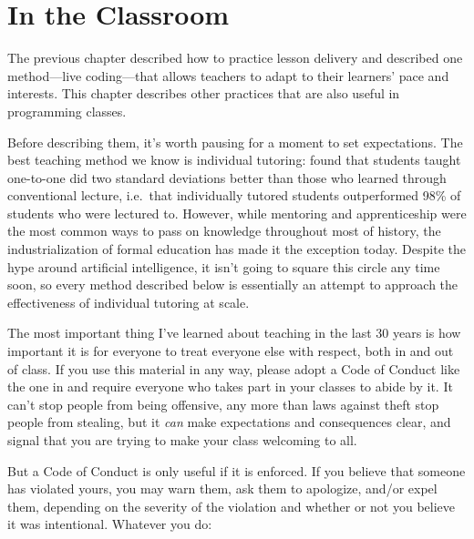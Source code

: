 \chapter{In the Classroom}\label{s:classroom}

The previous chapter described how to practice lesson delivery
and described one method---live coding---that
allows teachers to adapt to their learners' pace and interests.
This chapter describes other practices that are also useful in programming classes.

Before describing them,
it's worth pausing for a moment to set expectations.
The best teaching method we know is individual tutoring:
\cite{Bloo1984} found that students taught one-to-one
did two standard deviations better than those who learned through conventional lecture,
i.e.\ that individually tutored students outperformed
98\% of students who were lectured to.
However,
while mentoring and apprenticeship were the most common ways to pass on knowledge
throughout most of history,
the industrialization of formal education has made it the exception today.
Despite the hype around artificial intelligence,
it isn't going to square this circle any time soon,
so every method described below is essentially
an attempt to approach the effectiveness of individual tutoring at scale.


The most important thing I've learned about teaching in the last 30 years is
how important it is for everyone to treat everyone else with respect,
both in and out of class.
If you use this material in any way,
please adopt a Code of Conduct like the one in 
and require everyone who takes part in your classes to abide by it.
It can't stop people from being offensive,
any more than laws against theft stop people from stealing,
but it \emph{can} make expectations and consequences clear,
and signal that you are trying to make your class welcoming to all.

But a Code of Conduct is only useful if it is enforced.
If you believe that someone has violated yours,
you may warn them,
ask them to apologize,
and/or expel them,
depending on the severity of the violation and whether or not you believe it was intentional.
Whatever you do:


